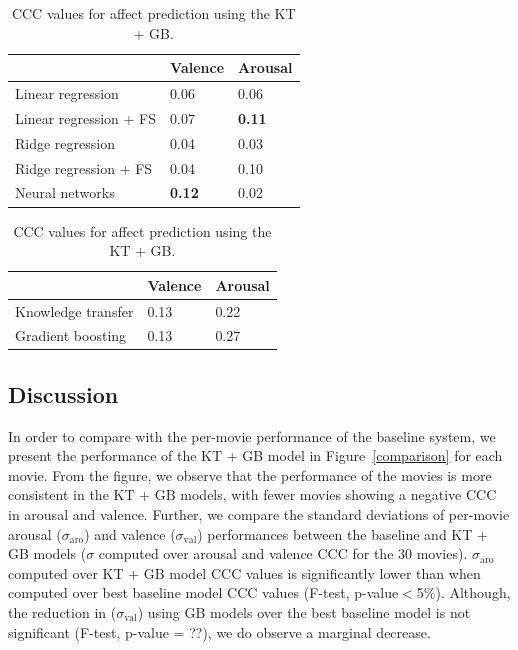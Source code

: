 \documentclass{article}
\begin{document}
\begin{table}[t]
\centering
\caption{CCC values for affect prediction using the baseline regressors. The best performances for each dimension are shown in bold. FS indicates training with feature selection.}
\begin{tabular}{@{}l|l|l@{}}
\hline
				        & Valence       & Arousal \\ \hline
Linear regression& 0.06  & 0.06  \\ 
Linear regression + FS & 0.07  & {\bf 0.11 } \\ 
Ridge regression & 0.04  & 0.03  \\ 
Ridge regression + FS & 0.04  & 0.10  \\ 
Neural networks& {\bf 0.12 } & 0.02  \\ 
\end{tabular}
\label{Baseline_table}
\caption{CCC values for affect prediction using the KT + GB.} 
\begin{tabular}{@{}l|l|l@{}}
\hline
				        & Valence       & Arousal \\ \hline
Knowledge transfer\;\;\;\;\;& 0.13  & 0.22  \\ 
Gradient boosting& 0.13  & 0.27  \\ 
\end{tabular}
\label{KT_table}
\end{table}
\subsection{Discussion}

In order to compare with the per-movie performance of the baseline system, we present the performance of the KT + GB model in Figure~\ref{comparison} for each movie.
From the figure, we observe that the performance of the movies is more consistent in the KT + GB models, with fewer movies showing a negative CCC in arousal and valence.
Further, we compare the standard deviations of per-movie arousal ($\sigma_\text{aro}$) and valence ($\sigma_\text{val}$) performances between the baseline and KT + GB models ($\sigma$ computed over arousal and valence CCC for the 30 movies). 
$\sigma_\text{aro}$ computed over KT + GB model CCC values is significantly lower than when computed over best baseline model CCC values (F-test, p-value$<$5\%). 
Although, the reduction in ($\sigma_\text{val}$) using GB models over the best baseline model is not significant (F-test, p-value = ??), we do observe a marginal decrease. 
\end{document}
